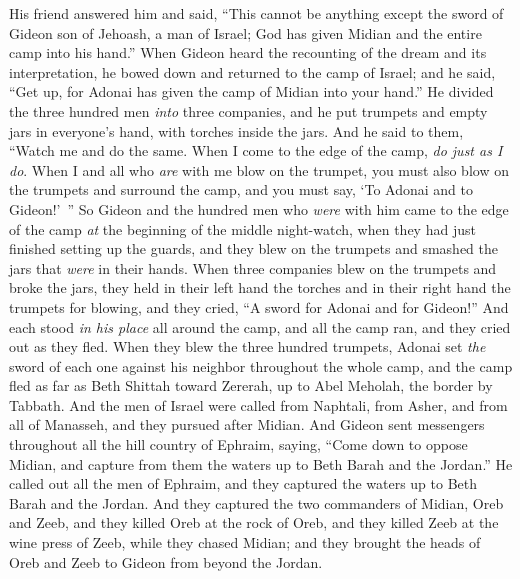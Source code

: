 \begin{biblechapter}
\verse His friend answered him and said, “This cannot be anything except the sword of Gideon son of Jehoash, a man of Israel; God has given Midian and the entire camp into his hand.”
\verse When Gideon heard the recounting of the dream and its interpretation, he bowed down and returned to the camp of Israel; and he said, “Get up, for Adonai has given the camp of Midian into your hand.”
\verse He divided the three hundred men \textit{into} three companies, and he put trumpets and empty jars in everyone’s hand, with torches inside the jars.
\verse And he said to them, “Watch me and do the same. When I come to the edge of the camp, \textit{do just as I do}.
\verse When I and all who \textit{are} with me blow on the trumpet, you must also blow on the trumpets and surround the camp, and you must say, ‘To Adonai and to Gideon!’ ”
\verse So Gideon and the hundred men who \textit{were} with him came to the edge of the camp \textit{at} the beginning of the middle night-watch, when they had just finished setting up the guards, and they blew on the trumpets and smashed the jars that \textit{were} in their hands.
\verse When three companies blew on the trumpets and broke the jars, they held in their left hand the torches and in their right hand the trumpets for blowing, and they cried, “A sword for Adonai and for Gideon!”
\verse And each stood \textit{in his place} all around the camp, and all the camp ran, and they cried out as they fled.
\verse When they blew the three hundred trumpets, Adonai set \textit{the} sword of each one against his neighbor throughout the whole camp, and the camp fled as far as Beth Shittah toward Zererah, up to Abel Meholah, the border by Tabbath.
\verse And the men of Israel were called from Naphtali, from Asher, and from all of Manasseh, and they pursued after Midian.
\verse And Gideon sent messengers throughout all the hill country of Ephraim, saying, “Come down to oppose Midian, and capture from them the waters up to Beth Barah and the Jordan.” He called out all the men of Ephraim, and they captured the waters up to Beth Barah and the Jordan.
\verse And they captured the two commanders of Midian, Oreb and Zeeb, and they killed Oreb at the rock of Oreb, and they killed Zeeb at the wine press of Zeeb, while they chased Midian; and they brought the heads of Oreb and Zeeb to Gideon from beyond the Jordan.
\end{biblechapter}

